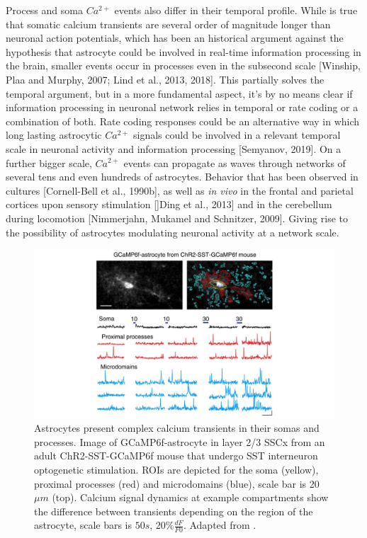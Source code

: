 Process and soma $Ca^{2+}$ events also differ in their temporal profile.
While is true that somatic calcium transients are several order of magnitude longer than neuronal action potentials, which has been an historical argument against the hypothesis that astrocyte could be involved in real-time information processing in the brain, smaller events occur in processes even in the subsecond scale [Winship, Plaa and Murphy, 2007; Lind et al., 2013, 2018].
This partially solves the temporal argument, but in a more fundamental aspect, it's by no means clear if information processing in neuronal network relies in temporal or rate coding or a combination of both.
Rate coding responses could be an alternative way in which long lasting astrocytic $Ca^{2+}$ signals could be involved in a relevant temporal scale in neuronal activity and information processing [Semyanov, 2019].
On a further bigger scale, $Ca^{2+}$ events can propagate as waves through networks of several tens and even hundreds of astrocytes.
Behavior that  has been observed in cultures [Cornell-Bell et al., 1990b], as well as \textit{in vivo} in the frontal and parietal cortices upon sensory stimulation []Ding et al., 2013] and in the cerebellum during locomotion [Nimmerjahn, Mukamel and Schnitzer, 2009].
Giving rise to the possibility of astrocytes modulating neuronal activity at a network scale. 
\begin{figure}
    \centering
    \includegraphics[trim={200 0 200 0},clip,width=\textwidth]{Figures/Chapter1/intro_fig_astro_calcium.pdf}
    \caption{Astrocytes present complex calcium transients in their somas and processes. Image of GCaMP6f-astrocyte in layer 2/3 SSCx from an adult ChR2-SST-GCaMP6f mouse that undergo SST interneuron optogenetic stimulation. ROIs are depicted for the soma (yellow), proximal processes (red) and microdomains (blue), scale bar is 20 $\mu m$ (top). Calcium signal dynamics at example compartments show the difference between transients depending on the region of the astrocyte, scale bars is $50 s$, $20\% \frac{dF}{F0}$. Adapted from \cite{mariotti2018}.}
    \label{fig:chap1:astro_calcium}
\end{figure}

